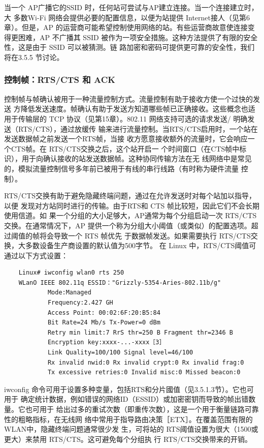 当一个 AP广播它的SSID 时，任何站可尝试与AP建立连接。当一个连接建立时，大
多数Wi-Fi 网络会提供必要的配置信息，以便为站提供 Internet接人（见第6章）。但是，AP
的运营商可能希望控制使用网络的站。有些运营商故意使连接变得更困难，AP 不广播其
SSID 被作为一项安全措施。这种方法提供了有限的安全性，这是由于 SSID 可以被猜测。链
路加密和密码可提供更可靠的安全性，我们将在3.5.5 节讨论。

\subsubsection{控制帧：RTS/CTS 和 ACK}

控制帧与帧确认被用于一种流量控制方式。流量控制有助于接收方使一个过快的发送
方降低发送速度。帧确认有助于发送方知道哪些帧已正确接收。这些概念也适用于传输层的
TCP 协议（见第15章）。802.11 网络支持可选的请求发送/ 明确发送（RTS/CTS），通过放缓传
输来进行流量控制。当RTS/CTS启用时，一个站在发送数据帧之前发送一个RTS帧，当接
收方愿意接收额外的流量时，它会响应一个CTS帧。在 RTS/CTS交换之后，这个站开启一
个时间窗口（在CTS帧中标识），用于向确认接收的站发送数据帧。这种协同传输方法在无
线网络中是常见的，模拟流量控制信号多年前已被用于有线的串行线路（有时称为硬件流量
控制）。

RTS/CTS交换有助于避免隐藏终端问题，通过在允许发送时对每个站加以指导，以便
发现对方站同时进行的传输。由于RTS和 CTS 帧比较短，因此它们不会长期使用信道。如
果一个分组的大小足够大，AP通常为每个分组启动一次 RTS/CTS交换。在通常情况下，AP
提供一个称为分组大小阈值（或类似）的配置选项。超过阈值的帧将会导致一个 RTS 帧优先
于数据帧发送。如果需要执行 RTS/CTS交换，大多数设备生产商设置的默认值为500字节。
在 Linux 中，RTS/CTS阈值可通过以下方式设置：
\begin{verbatim}
    Linux# iwconfig wlan0 rts 250
    WLanO IEEE 802.11q ESSID："Grizzly-5354-Aries-802.11b/g"
            Mode:Managed
            Frequency:2.427 GH
            Access Point: 00:02:6F:20:B5:84
            Bit Rate=24 Mb/s Tx-Power=0 dBm
            Retry min limit:7 RrS thr=250 B Fragment thr=2346 B
            Encryption key:xxxx-...-xxxx［3］
            Link Quality=100/100 Signal level=46/100
            Rx invalid nwid:0 Rx invalid crypt:0 Rx invalid frag:0
            Tx excessive retries:0 Invalid misc:0 Missed beacon:0
\end{verbatim}

iwconfig 命令可用于设置多种变量，包括RTS和分片國值（见3.5.1.3节）。它也可用于
确定统计数据，例如错误的网络ID（ESSID）或加密密钥而导致的帧出错数量。它也可用于
给出过多的重试次数（即重传次数），这是一个用于衡量链路可靠性的粗略指标，在无线网
络中常用于指导路由决策［ETX］。在覆盖范围有限的WLAN中，隐藏终端问题通常很少发
生，可将站的 RTS阈值设置为很大（1500或更大）来禁用 RTS/CTS。这可避免每个分组执
行 RTS/CTS交换带来的开销。

